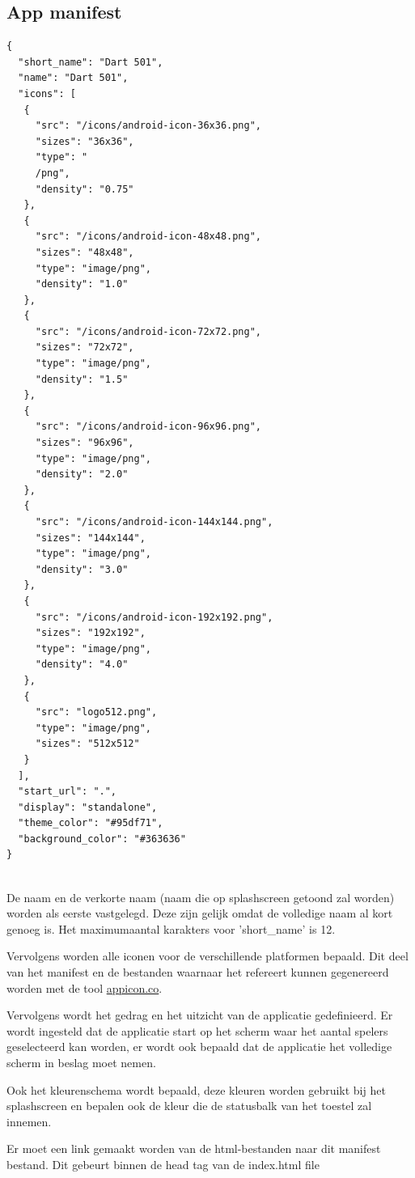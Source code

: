 	\subsection{App manifest}
\begin{lstlisting}
{
  "short_name": "Dart 501",
  "name": "Dart 501",
  "icons": [
   {
     "src": "/icons/android-icon-36x36.png",
     "sizes": "36x36",
     "type": "
     /png",
     "density": "0.75"
   },
   {
     "src": "/icons/android-icon-48x48.png",
     "sizes": "48x48",
     "type": "image/png",
     "density": "1.0"
   },
   {
     "src": "/icons/android-icon-72x72.png",
     "sizes": "72x72",
     "type": "image/png",
     "density": "1.5"
   },
   {
     "src": "/icons/android-icon-96x96.png",
     "sizes": "96x96",
     "type": "image/png",
     "density": "2.0"
   },
   {
     "src": "/icons/android-icon-144x144.png",
     "sizes": "144x144",
     "type": "image/png",
     "density": "3.0"
   },
   {
     "src": "/icons/android-icon-192x192.png",
     "sizes": "192x192",
     "type": "image/png",
     "density": "4.0"
   },
   {
     "src": "logo512.png",
     "type": "image/png",
     "sizes": "512x512"
   }
  ],
  "start_url": ".",
  "display": "standalone",
  "theme_color": "#95df71",
  "background_color": "#363636"
}
	
\end{lstlisting}
		
		De naam en de verkorte naam (naam die op splashscreen getoond zal worden) worden als eerste vastgelegd. Deze zijn gelijk omdat de volledige naam al kort genoeg is. Het maximumaantal karakters voor 'short\_name' is 12.
 
		
		Vervolgens worden alle iconen voor de verschillende platformen bepaald. Dit deel van het manifest en de bestanden waarnaar het refereert kunnen gegenereerd worden met de tool \href{https://appicon.co}{appicon.co}.
		
		Vervolgens wordt het gedrag en het uitzicht van de applicatie gedefinieerd. Er wordt ingesteld dat de applicatie start op het scherm waar het aantal spelers geselecteerd kan worden, er wordt ook bepaald dat de applicatie het volledige scherm in beslag moet nemen.
		
		Ook het kleurenschema wordt bepaald, deze kleuren worden gebruikt bij het splashscreen en bepalen ook de kleur die de statusbalk van het toestel zal innemen. 
		
		Er moet een link gemaakt worden van de html-bestanden naar dit manifest bestand. Dit gebeurt binnen de head tag van de index.html file
		
